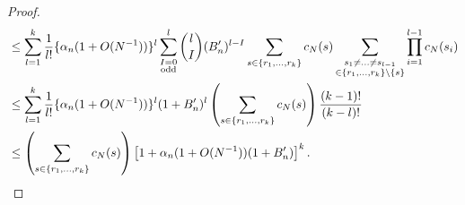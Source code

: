 \documentclass{article}
\newcommand{\1}[1]{\mathbbm{1}_{#1}}
\begin{document}
\begin{proof}
\begin{align}
&\leq \sum_{l=1}^{k} \frac{1}{l!} \{ \alpha_n (1+O(N^{-1})) \}^l 
\sum_{\substack{I=0 \\ \text{odd} }}^l
\binom{l}{I} (B_n^\prime)^{l-I} 
\sum_{s\in \{r_1,\dots,r_k\} } c_N(s)
\sum_{\substack{s_1 \neq\dots\neq s_{l-1} \\ \in \{r_1,\dots,r_k\}\setminus \{s\} }}
\prod_{i=1}^{l-1} c_N(s_i)  \notag\\
&\leq \sum_{l=1}^{k} \frac{1}{l!} \{ \alpha_n (1+O(N^{-1})) \}^l 
(1 + B_n^\prime)^l \left( \sum_{s\in \{r_1,\dots,r_k\} } c_N(s) \right)
\frac{(k-1)!}{(k-l)!} \notag\\
&\leq \left( \sum_{s\in \{r_1,\dots,r_k\} } c_N(s) \right)
\left[ 1 + \alpha_n (1+O(N^{-1})) (1 + B_n^\prime) \right]^k .
\end{align}

\end{proof}
\end{document}
